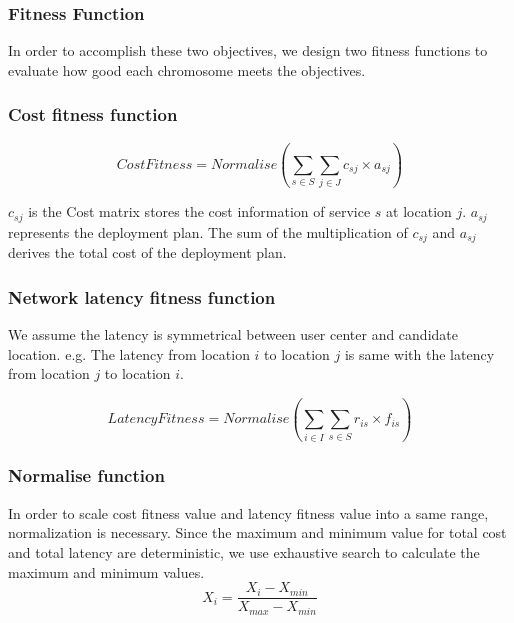 \documentclass{llncs}
\begin{document}
\subsubsection{Fitness Function}

\begin{flushleft}In order to accomplish these two objectives, we design two fitness functions to evaluate 
how good each chromosome meets the objectives.\end{flushleft}
\subsubsection{Cost fitness function}

\begin{equation}
	CostFitness = Normalise(\sum\limits_{s \in S} \sum\limits_{j \in J} c_{sj} \times a_{sj})
\end{equation}

$c_{sj}$ is the Cost matrix stores the cost information of service $s$ at location $j$. $a_{sj}$ represents the deployment plan. The sum of the multiplication of 
$c_{sj}$ and $a_{sj}$ derives the total cost of the deployment plan.



\subsubsection{Network latency fitness function}
We assume the latency is symmetrical between user center and candidate location. e.g. 
The latency from location $i$ to location $j$ is same with the latency from location $j$ to location $i$.

	\begin{equation}
		LatencyFitness = Normalise(\sum\limits_{i \in I} \sum\limits_{s \in S} r_{is} \times f_{is})
	\end{equation}

\subsubsection{Normalise function}
In order to scale cost fitness value and latency fitness value into a same range, normalization is necessary.
Since the maximum and minimum value for total cost and total latency are deterministic, we use exhaustive search to
calculate the maximum and minimum values.
	\begin{equation}
		X_{i} = \frac{X_{i} - X_{min}}{X_{max} - X_{min}}
	\end{equation}
\end{document}
